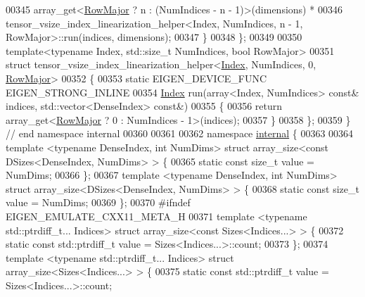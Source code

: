 \begin{DoxyCode}
00345       array\_get<\hyperlink{group__enums_ggaacded1a18ae58b0f554751f6cdf9eb13acfcde9cd8677c5f7caf6bd603666aae3}{RowMajor} ? n : (NumIndices - n - 1)>(dimensions) *
00346         tensor\_vsize\_index\_linearization\_helper<Index, NumIndices, n - 1, RowMajor>::run(indices, 
      dimensions);
00347   \}
00348 \};
00349 
00350 \textcolor{keyword}{template}<\textcolor{keyword}{typename} Index, std::\textcolor{keywordtype}{size\_t} NumIndices, \textcolor{keywordtype}{bool} RowMajor>
00351 \textcolor{keyword}{struct }tensor\_vsize\_index\_linearization\_helper<\hyperlink{namespace_eigen_a62e77e0933482dafde8fe197d9a2cfde}{Index}, NumIndices, 0, 
      \hyperlink{group__enums_ggaacded1a18ae58b0f554751f6cdf9eb13acfcde9cd8677c5f7caf6bd603666aae3}{RowMajor}>
00352 \{
00353   \textcolor{keyword}{static} EIGEN\_DEVICE\_FUNC EIGEN\_STRONG\_INLINE
00354   \hyperlink{namespace_eigen_a62e77e0933482dafde8fe197d9a2cfde}{Index} run(array<Index, NumIndices> \textcolor{keyword}{const}& indices, std::vector<DenseIndex> \textcolor{keyword}{const}&)
00355   \{
00356     \textcolor{keywordflow}{return} array\_get<\hyperlink{group__enums_ggaacded1a18ae58b0f554751f6cdf9eb13acfcde9cd8677c5f7caf6bd603666aae3}{RowMajor} ? 0 : NumIndices - 1>(indices);
00357   \}
00358 \};
00359 \}  \textcolor{comment}{// end namespace internal}
00360 
00361 
00362 \textcolor{keyword}{namespace }\hyperlink{namespaceinternal}{internal} \{
00363 
00364 \textcolor{keyword}{template} <\textcolor{keyword}{typename} DenseIndex, \textcolor{keywordtype}{int} NumDims> \textcolor{keyword}{struct }array\_size<const DSizes<DenseIndex, NumDims> > \{
00365   \textcolor{keyword}{static} \textcolor{keyword}{const} \textcolor{keywordtype}{size\_t} value = NumDims;
00366 \};
00367 \textcolor{keyword}{template} <\textcolor{keyword}{typename} DenseIndex, \textcolor{keywordtype}{int} NumDims> \textcolor{keyword}{struct }array\_size<DSizes<DenseIndex, NumDims> > \{
00368   \textcolor{keyword}{static} \textcolor{keyword}{const} \textcolor{keywordtype}{size\_t} value = NumDims;
00369 \};
00370 \textcolor{preprocessor}{#ifndef EIGEN\_EMULATE\_CXX11\_META\_H}
00371 \textcolor{keyword}{template} <\textcolor{keyword}{typename} std::ptrdiff\_t... Indices> \textcolor{keyword}{struct }array\_size<const Sizes<Indices...> > \{
00372 \textcolor{keyword}{static} \textcolor{keyword}{const} std::ptrdiff\_t value = Sizes<Indices...>::count;
00373 \};
00374 \textcolor{keyword}{template} <\textcolor{keyword}{typename} std::ptrdiff\_t... Indices> \textcolor{keyword}{struct }array\_size<Sizes<Indices...> > \{
00375 \textcolor{keyword}{static} \textcolor{keyword}{const} std::ptrdiff\_t value = Sizes<Indices...>::count;

\end{DoxyCode}
